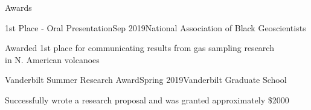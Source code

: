 \documentclass{resume} %
\begin{document}
\begin{rSection}{Awards}

\begin{rSubsection}{1st Place - Oral Presentation}{Sep 2019}{National Association of Black Geoscientists}{}
\item {Awarded 1st place for communicating results from gas sampling research \\ in N. American volcanoes}
\end{rSubsection}


\begin{rSubsection}{Vanderbilt Summer Research Award}{Spring 2019}{Vanderbilt Graduate School}{}
\item{Successfully wrote a research proposal and was granted approximately \$2000}
\end{rSubsection}

\end{rSection}

\end{document}

